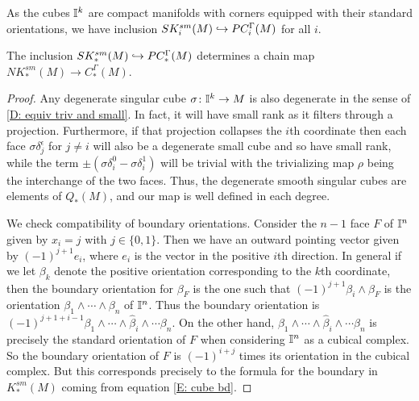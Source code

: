 As the cubes $\mathbb{I}^k$ are compact manifolds with corners equipped with their standard orientations,
we have inclusion $SK^{sm}_i(M) \hookrightarrow PC_i^\Gamma(M)$ for all $i$.

\begin{lemma}
	The inclusion $SK^{sm}_*(M) \hookrightarrow PC_*^\Gamma(M)$ determines a chain map $NK^{sm}_*(M) \to C_*^\Gamma(M)$.
\end{lemma}

\begin{proof}
	Any degenerate singular cube $\sigma \colon \mathbb{I}^k \to M$ is also degenerate in the sense of \cref{D: equiv triv and small}. In fact, it will have small rank as it filters through a projection. Furthermore, if that projection collapses the $i$th coordinate then each face $\sigma \delta_j^\epsilon$ for $j\neq i$ will also be a degenerate small cube and so have small rank, while the term $\pm (\sigma \delta_i^0-\sigma \delta_i^1)$ will be trivial with the trivializing map $\rho$ being the interchange of the two faces. Thus, the degenerate smooth singular cubes are elements of $Q_*(M)$, and our map is well defined in each degree.

	We check compatibility of boundary orientations. Consider the $n-1$ face $F$ of $\mathbb{I}^n$ given by $x_i = j$ with $j\in\{0,1\}$. Then we have an outward pointing vector given by $(-1)^{j+1}e_i$, where $e_i$ is the vector in the positive $i$th direction. In general if we let $\beta_k$ denote the positive orientation corresponding to the $k$th coordinate, then the boundary orientation for $\beta_F$ is the one such that
	$(-1)^{j+1}\beta_i\wedge\beta_F$ is the orientation $\beta_1 \wedge\cdots\wedge \beta_n$ of $\mathbb{I}^n$. Thus the boundary orientation is $(-1)^{j+1+i-1}\beta_1 \wedge \cdots \wedge \hat{\beta}_i \wedge \cdots\beta_n$. On the other hand, $\beta_1 \wedge \cdots \wedge \hat{\beta}_i \wedge \cdots\beta_n$ is precisely the standard orientation of $F$ when considering $\mathbb{I}^n$ as a cubical complex. So the boundary orientation of $F$ is $(-1)^{i+j}$ times its orientation in the cubical complex. But this corresponds precisely to the formula for the boundary in $K^{sm}_*(M)$ coming from equation \eqref{E: cube bd}.
\end{proof}

